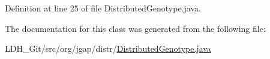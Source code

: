 Definition at line 25 of file Distributed\-Genotype.\-java.



The documentation for this class was generated from the following file\-:\begin{DoxyCompactItemize}
\item 
L\-D\-H\-\_\-\-Git/src/org/jgap/distr/\hyperlink{_distributed_genotype_8java}{Distributed\-Genotype.\-java}\end{DoxyCompactItemize}
